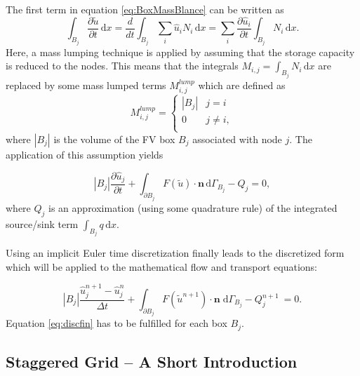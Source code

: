 The first term in equation \eqref{eq:BoxMassBlance} can be written as
\begin{equation}
\int_{B_j} \frac{\partial \tilde u}{\partial t} \, \mathrm{d}x = \frac{d}{dt} \int_{B_j} \sum_i \hat u_i N_i  \, \mathrm{d}x = \sum_i \frac{\partial \hat u_i}{\partial t} \int_{B_j}  N_i  \, \mathrm{d}x.
\end{equation}
Here, a mass lumping technique is applied by assuming that the storage capacity is
reduced to the nodes. This means that the integrals $M_{i,j} = \int_{B_j}  N_i \, \mathrm{d}x$
are replaced by some mass lumped terms $M^{lump}_{i,j}$ which are defined as
\begin{equation}
   M^{lump}_{i,j} =\begin{cases}  |B_j| &j = i\\
  0 &j \neq i,\\
           \end{cases}
\end{equation}
where $|B_j|$ is the volume of the FV box $B_j$ associated with node $j$.
The application of this assumption yields

\begin{equation}
\label{eq:disc1}
  |B_j| \frac{\partial \hat u_j}{\partial t}
  +  \int_{\partial B_j}  F(\tilde u) \cdot \mathbf n \, \mathrm{d}\Gamma_{B_j} - Q_j = 0,
\end{equation}
where $Q_j$ is an approximation (using some quadrature rule) of the integrated source/sink term $\int_{B_j} q \, \mathrm{d}x$.

Using an implicit Euler time discretization finally
leads to the discretized form which will be applied to the mathematical
flow and transport equations:

\begin{equation}
\label{eq:discfin}
  |B_j| \frac{\hat u_j^{n+1} - \hat u_j^{n}}{\Delta t}
  + \int_{\partial B_j}  F(\tilde u^{n+1}) \cdot \mathbf n
  \;   \mathrm{d}\Gamma_{B_j} - Q_j^{n+1} \: = 0.
\end{equation}
Equation \eqref{eq:discfin} has to be fulfilled for each box $B_j$.
%
\subsection{Staggered Grid -- A Short Introduction}\label{staggered}


